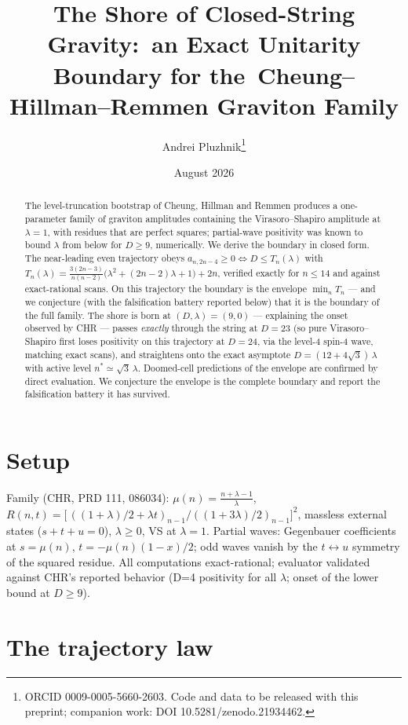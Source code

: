 \documentclass[11pt]{article}
\title{The Shore of Closed-String Gravity:\ an Exact Unitarity Boundary for the\ Cheung--Hillman--Remmen Graviton Family}
\author{Andrei Pluzhnik\thanks{ORCID 0009-0005-5660-2603. Code and data to be
released with this preprint; companion work: DOI 10.5281/zenodo.21934462.}}
\date{August 2026}
\begin{document}
\maketitle

\begin{abstract}
The level-truncation bootstrap of Cheung, Hillman and Remmen produces a
one-parameter family of graviton amplitudes containing the Virasoro--Shapiro
amplitude at $\lambda=1$, with residues that are perfect squares; partial-wave
positivity was known to bound $\lambda$ from below for $D\ge 9$, numerically.
We derive the boundary in closed form. The near-leading even trajectory obeys
$a_{n,2n-4}\ge 0 \iff D\le T_n(\lambda)$ with
$T_n(\lambda)=\tfrac{3(2n-3)}{n(n-2)}\bigl(\lambda^2+(2n-2)\lambda+1\bigr)+2n$,
verified exactly for $n\le 14$ and against exact-rational scans. On this trajectory the boundary is the envelope $\min_nT_n$ --- and we
conjecture (with the falsification battery reported below) that it is the
boundary of the full family. The shore is born at $(D,\lambda)=(9,0)$ ---
explaining the onset observed by CHR --- passes \emph{exactly} through the
string at $D=23$ (so pure Virasoro--Shapiro first loses positivity on this
trajectory at $D=24$, via the level-4 spin-4 wave, matching exact scans), and
straightens onto the exact asymptote $D=(12+4\sqrt3)\,\lambda$ with active
level $n^*\simeq\sqrt3\,\lambda$. Doomed-cell predictions of the envelope are
confirmed by direct evaluation. We conjecture the envelope is the complete
boundary and report the falsification battery it has survived.
\end{abstract}

\section{Setup}
Family (CHR, PRD 111, 086034): $\mu(n)=\frac{n+\lambda-1}{\lambda}$,
$R(n,t)=\bigl[\,((1{+}\lambda)/2+\lambda t)_{n-1}/((1{+}3\lambda)/2)_{n-1}\bigr]^2$,
massless external states ($s+t+u=0$), $\lambda\ge0$, VS at $\lambda=1$.
Partial waves: Gegenbauer coefficients at $s=\mu(n)$, $t=-\mu(n)(1-x)/2$; odd
waves vanish by the $t\leftrightarrow u$ symmetry of the squared residue.
All computations exact-rational; evaluator validated against CHR's reported
behavior (D=4 positivity for all $\lambda$; onset of the lower bound at
$D\ge9$).

\section{The trajectory law}
\end{document}
